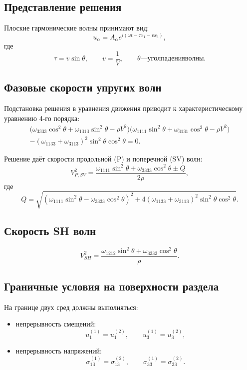 \subsection*{Представление решения}

Плоские гармонические волны принимают вид:
\[
u_\alpha = A_\alpha e^{i(\omega t - \tau x_1 - v x_3)},
\]
где
\[
\tau = v \sin\theta, \qquad v = \frac{1}{V}, \qquad \theta — угол падения волны.
\]

\subsection*{Фазовые скорости упругих волн}

Подстановка решения в уравнения движения приводит к характеристическому уравнению 4-го порядка:
\[
\begin{aligned}
\big(\omega_{3333}\cos^2 \theta + \omega_{1313}\sin^2 \theta - \rho V^2\big)
\big(\omega_{1111}\sin^2 \theta + \omega_{3131}\cos^2 \theta - \rho V^2\big) \\
-
(\omega_{1133}+\omega_{3113})^2 \sin^2 \theta \cos^2 \theta = 0.
\end{aligned}
\]

Решение даёт скорости продольной (P) и поперечной (SV) волн:
\[
V_{P,SV}^2
=
\frac{\omega_{1111}\sin^2\theta + \omega_{3333}\cos^2\theta \pm Q}{2\rho},
\]
где
\[
Q = \sqrt{
\left(\omega_{1111}\sin^2\theta - \omega_{3333}\cos^2\theta\right)^2
+4(\omega_{1133}+\omega_{3113})^2 \sin^2\theta\cos^2\theta}.
\]

\subsection*{Скорость SH волн}

\[
V_{SH}^2 =
\frac{\omega_{1212} \sin^2\theta + \omega_{3232} \cos^2\theta}{\rho}.
\]

\subsection*{Граничные условия на поверхности раздела}

На границе двух сред должны выполняться:
\begin{itemize}
    \item непрерывность смещений:
    \[
    u_1^{(1)} = u_1^{(2)}, \qquad u_3^{(1)} = u_3^{(2)},
    \]
    \item непрерывность напряжений:
    \[
    \sigma_{13}^{(1)} = \sigma_{13}^{(2)}, \qquad \sigma_{33}^{(1)} = \sigma_{33}^{(2)}.
    \]
\end{itemize}

